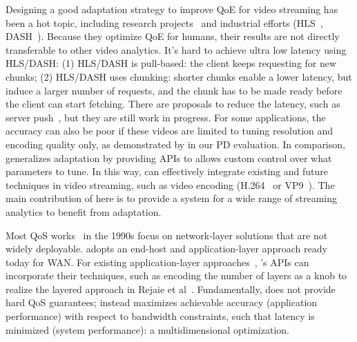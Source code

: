  Designing a good adaptation strategy to improve
QoE for video streaming has been a hot topic, including research
projects~\cite{mao2017neural, yin2015control, sun2016cs2p} and industrial
efforts (HLS~\cite{pantos2016http}, DASH~\cite{sodagar2011mpeg,
  michalos2012dynamic}). Because they optimize QoE for humans, their results are
not directly transferable to other video analytics.  It's hard to achieve ultra low latency using
HLS/DASH: (1) HLS/DASH is pull-based: the client keeps requesting for new
chunks; (2) HLS/DASH uses chunking: shorter chunks enable a lower latency, but
induce a larger number of requests, and the chunk has to be made ready before
the client can start fetching. There are proposals to reduce the latency, such
as server push~\cite{wei2014low}, but they are still work in progress. For some
applications, the accuracy can also be poor if these videos are limited to
tuning resolution and encoding quality only, as demonstrated by in our PD
evaluation. In comparison, \sysname{} generalizes adaptation by providing
\maybe{} APIs to allows custom control over what parameters to tune. In this
way, \sysname{} can effectively integrate existing and future techniques in
video streaming, such as video encoding (H.264~\cite{richardson2011h} or
VP9~\cite{grange2016vp9}). The main contribution of \sysname{} here is to
provide a system for a wide range of streaming analytics to benefit from
adaptation.

 Most QoS works~\cite{ferrari1990scheme, shenker1994integrated,
  shenker1995fundamental} in the 1990s focus on network-layer solutions that are
not widely deployable. \sysname{} adopts an end-host and application-layer
approach ready today for WAN. For existing application-layer
approaches~\cite{vandalore2001survey}, \sysname{}'s APIs can incorporate their
techniques, such as encoding the number of layers as a knob to realize the
layered approach in Rejaie et al~\cite{rejaie2000layered}. Fundamentally,
\sysname{} does not provide hard QoS guarantees; instead \sysname{} maximizes
achievable accuracy (application performance) with respect to bandwidth
constraints, such that latency is minimized (system performance): a
multidimensional optimization.


